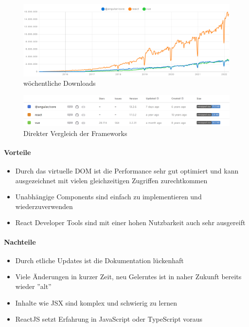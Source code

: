 \begin{figure}[hbt!]
    \centering
    \includegraphics[scale=0.15]{pics/angular-react-vue-npm-chart}
    \caption{wöchentliche Downloads~\cite{angular-react-vue-stats}}
    \label{fig:angular-react-vue-chart}
\end{figure}
\begin{figure}[hbt!]
    \centering
    \includegraphics[scale=0.5]{pics/angular-react-vue-npm-stats}
    \caption{Direkter Vergleich der Frameworks~\cite{angular-react-vue-stats}}
    \label{fig:angular-react-vue-stats}
\end{figure}

\paragraph{Vorteile}
\begin{itemize}
    \item Durch das virtuelle DOM ist die Performance sehr gut optimiert und kann ausgezeichnet mit vielen gleichzeitigen Zugriffen zurechtkommen
    \item Unabhängige Components sind einfach zu implementieren und wiederzuverwenden
    \item React Developer Tools sind mit einer hohen Nutzbarkeit auch sehr ausgereift
\end{itemize}

\paragraph{Nachteile}
\begin{itemize}
    \item Durch etliche Updates ist die Dokumentation lückenhaft
    \item Viele Änderungen in kurzer Zeit, neu Gelerntes ist in naher Zukunft bereits wieder ''alt''
    \item Inhalte wie JSX sind komplex und schwierig zu lernen
    \item ReactJS setzt Erfahrung in JavaScript oder TypeScript voraus
\end{itemize}

